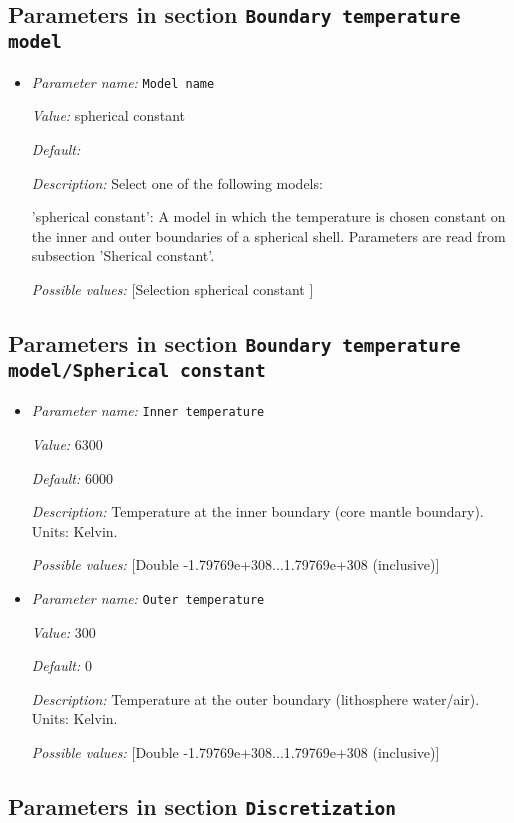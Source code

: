 \subsection{Parameters in section \tt Boundary temperature model}

\begin{itemize}
\item {\it Parameter name:} {\tt Model name}


{\it Value:} spherical constant


{\it Default:} 


{\it Description:} Select one of the following models:

'spherical constant': A model in which the temperature is chosen constant on the inner and outer boundaries of a spherical shell. Parameters are read from subsection 'Sherical constant'.


{\it Possible values:} [Selection spherical constant ]
\end{itemize}



\subsection{Parameters in section \tt Boundary temperature model/Spherical constant}

\begin{itemize}
\item {\it Parameter name:} {\tt Inner temperature}


{\it Value:} 6300


{\it Default:} 6000


{\it Description:} Temperature at the inner boundary (core mantle boundary). Units: Kelvin.


{\it Possible values:} [Double -1.79769e+308...1.79769e+308 (inclusive)]
\item {\it Parameter name:} {\tt Outer temperature}


{\it Value:} 300


{\it Default:} 0


{\it Description:} Temperature at the outer boundary (lithosphere water/air). Units: Kelvin.


{\it Possible values:} [Double -1.79769e+308...1.79769e+308 (inclusive)]
\end{itemize}

\subsection{Parameters in section \tt Discretization}

